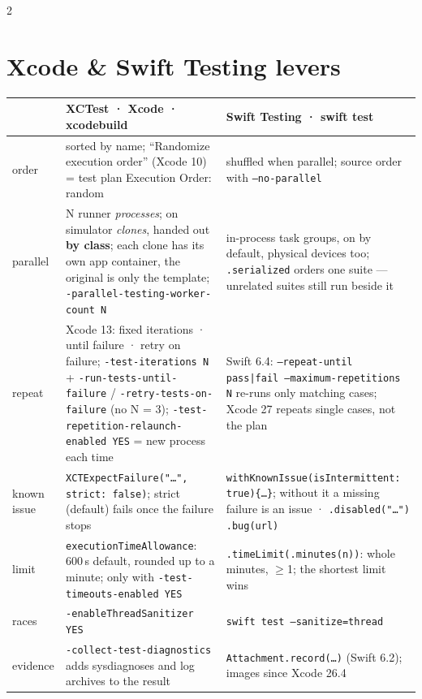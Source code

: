 \documentclass[8pt]{extarticle}
\newcommand\ct[1]{\texttt{#1}}
\begin{document}
\begin{multicols}{2}
\section{Xcode \& Swift Testing levers}
{\scriptsize\setlength{\tabcolsep}{2pt}
\begin{tabular}{@{}>{\raggedright\arraybackslash}p{9mm}>{\raggedright\arraybackslash}p{37mm}>{\raggedright\arraybackslash}p{31mm}@{}}
\toprule
& \textbf{XCTest · Xcode · xcodebuild} & \textbf{Swift Testing · swift test}\\
\midrule
order & sorted by name; ``Randomize execution order'' (Xcode 10) = test plan Execution Order: random & shuffled when parallel; source order with \ct{--no-parallel}\\
parallel & N runner \emph{processes}; on simulator \emph{clones}, handed out \textbf{by class}; each clone has its own app container, the original is only the template; \ct{-parallel-testing-worker-count N} & in-process task groups, on by default, physical devices too; \ct{.serialized} orders one suite — unrelated suites still run beside it\\
repeat & Xcode 13: fixed iterations · until failure · retry on failure; \ct{-test-iterations N} + \ct{-run-tests-until-failure} / \ct{-retry-tests-on-failure} (no N = 3); \ct{-test-repetition-relaunch-enabled YES} = new process each time & Swift 6.4: \ct{--repeat-until pass|fail --maximum-repetitions N} re-runs only matching cases; Xcode 27 repeats single cases, not the plan\\
known issue & \ct{XCTExpectFailure("…", strict: false)}; strict (default) fails once the failure stops & \ct{withKnownIssue(isIntermittent: true)\{…\}}; without it a missing failure is an issue · \ct{.disabled("…")} \ct{.bug(url)}\\
limit & \ct{executionTimeAllowance}: 600\,s default, rounded up to a minute; only with \ct{-test-timeouts-enabled YES} & \ct{.timeLimit(.minutes(n))}: whole minutes, $\ge$1; the shortest limit wins\\
races & \ct{-enableThreadSanitizer YES} & \ct{swift test --sanitize=thread}\\
evidence & \ct{-collect-test-diagnostics} adds sysdiagnoses and log archives to the result & \ct{Attachment.record(…)} (Swift 6.2); images since Xcode 26.4\\
\bottomrule
\end{tabular}}


\end{multicols}
\end{document}
